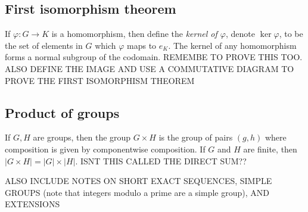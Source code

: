 \documentclass[class=article, crop=false]{standalone}
\begin{document}
\subsection{First isomorphism theorem}
If $\varphi:G \rightarrow K$ is a homomorphism, then define the \emph{kernel of $\varphi$}, denote $\ker \varphi$, to be the set of elements in $G$ which $\varphi$ maps to $e_K$. The kernel of any homomorphism forms a normal subgroup of the codomain. REMEMBE TO PROVE THIS TOO. ALSO DEFINE THE IMAGE AND USE A COMMUTATIVE DIAGRAM TO PROVE THE FIRST ISOMORPHISM THEOREM
\bigskip
\par
\begin{center}
    
\end{center}

\subsection{Product of groups}
If $G,H$ are groups, then the group $G \times H$ is the group of pairs $(g,h)$ where composition is given by componentwise composition. If $G$ and $H$ are finite, then $|G \times H|=|G| \times |H|$. ISNT THIS CALLED THE DIRECT SUM??
\par
ALSO INCLUDE NOTES ON SHORT EXACT SEQUENCES, SIMPLE GROUPS (note that integers modulo a prime are a simple group), AND EXTENSIONS
\end{document}
